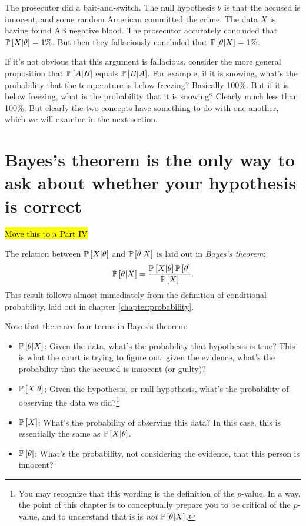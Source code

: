 The prosecutor did a bait-and-switch. The null hypothesis $\theta$ is that the accused is innocent, and some random American committed the crime. The data $X$ is having found AB negative blood. The prosecutor accurately concluded that $\mathbb{P}\left[{X | \theta}\right] = 1\%$. But then they fallaciously concluded that $\mathbb{P}\left[{\theta | X}\right] = 1\%$.

If it's not obvious that this argument is fallacious, consider the more general proposition that $\mathbb{P}\left[{A | B}\right]$ equals $\mathbb{P}\left[{B | A}\right]$. For example, if it is snowing, what's the probability that the temperature is below freezing? Basically 100\%. But if it is below freezing, what is the probability that it is snowing? Clearly much less than 100\%. But clearly the two concepts have something to do with one another, which we will examine in the next section.

\section{Bayes's theorem is the only way to ask about whether your hypothesis is correct}

\hl{Move this to a Part IV}

The relation between $\mathbb{P}\left[{X | \theta}\right]$ and $\mathbb{P}\left[{\theta | X}\right]$ is laid out in \emph{Bayes's theorem}:
\begin{equation}
\mathbb{P}\left[{\theta | X}\right] = \frac{\mathbb{P}\left[{X | \theta}\right] \mathbb{P}\left[{\theta}\right]}{\mathbb{P}\left[{X}\right]}.
\end{equation}
This result follows almost immediately from the definition of conditional probability, laid out in chapter \ref{chapter:probability}.

Note that there are four terms in Bayes's theorem:
\begin{itemize}
\item $\mathbb{P}\left[{\theta | X}\right]$: Given the data, what's the probability that hypothesis is true? This is what the court is trying to figure out: given the evidence, what's the probability that the accused is innocent (or guilty)?
\item $\mathbb{P}\left[{X | \theta}\right]$: Given the hypothesis, or null hypothesis, what's the probability of observing the data we did?\footnote{You may recognize that this wording is the definition of the $p$-value. In a way, the point of this chapter is to conceptually prepare you to be critical of the $p$-value, and to understand that is is \emph{not} $\mathbb{P}\left[{\theta | X}\right]$.}
\item $\mathbb{P}\left[{X}\right]$: What's the probability of observing this data? In this case, this is essentially the same as $\mathbb{P}\left[{X | \theta}\right]$.
\item $\mathbb{P}\left[{\theta}\right]$: What's the probability, not considering the evidence, that this person is innocent?
\end{itemize}

